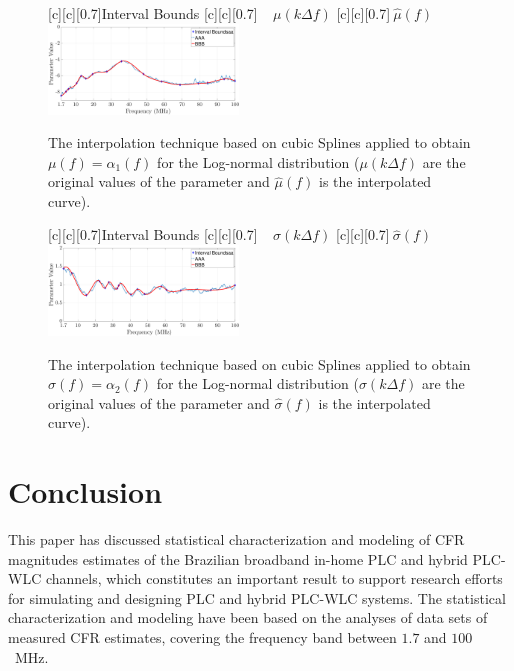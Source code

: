 \documentclass[journal]{IEEEtran}
\begin{document}
\begin{figure}[h]
	\centering
	[c][0.7]{Interval Bounds}
	[c][0.7]{$~~~~~\mu(k \Delta f)$}
	[c][0.7]{$~\hat{\mu}(f)$}
	\includegraphics[width=0.45\textwidth]{images/Alfa_fitlW.eps}
	\caption{The interpolation technique based on cubic Splines applied to obtain $\mu(f)=\alpha_1(f)$ for the Log-normal distribution (${\mu}(k \Delta f)$ are the original values of the parameter and $\hat{\mu}(f)$ is the interpolated curve).}
	\label{Fit_alfalW}
\end{figure}

\begin{figure}[h]
	\centering
	[c][0.7]{Interval Bounds}
	[c][0.7]{$~~~~~{\sigma}(k \Delta f)$}
	[c][0.7]{$~\hat{\sigma}(f)$}
	\includegraphics[width=0.45\textwidth]{images/Beta_fitlW.eps}
	\caption{The interpolation technique based on cubic Splines applied to obtain $\sigma(f)=\alpha_2(f)$ for the Log-normal distribution (${\sigma}(k \Delta f)$ are the original values of the parameter and $\hat{\sigma}(f)$ is the interpolated curve).}
	\label{Fit_betalW}
\end{figure}

\section{Conclusion}
This paper has discussed statistical characterization and modeling of \ac{CFR} magnitudes estimates of the Brazilian broadband in-home \ac{PLC} and hybrid \ac{PLC}-\ac{WLC} channels, which constitutes an important result to support research efforts for simulating and designing \ac{PLC} and hybrid \ac{PLC}-\ac{WLC} systems. The statistical characterization and modeling have been based on the analyses of data sets of measured \ac{CFR} estimates, covering the frequency band between $1.7$ and $100$~MHz. 
\end{document}
